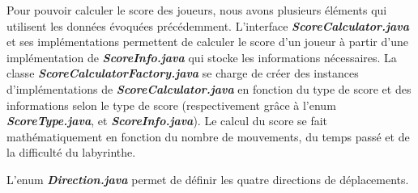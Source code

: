 Pour pouvoir calculer le score des joueurs, nous avons plusieurs éléments qui
utilisent les données évoquées précédemment. L'interface \textbf{\textit{ScoreCalculator.java}}
et ses implémentations permettent de calculer le score d'un joueur à partir
d'une implémentation de \textbf{\textit{ScoreInfo.java}} qui stocke les informations
nécessaires. La classe \textbf{\textit{ScoreCalculatorFactory.java}} se charge de créer des
instances d'implémentations de \textbf{\textit{ScoreCalculator.java}} en fonction du type de
score et des informations selon le type de score (respectivement grâce à l'enum
\textbf{\textit{ScoreType.java}}, et \textbf{\textit{ScoreInfo.java}}). Le calcul du score se fait
mathématiquement en fonction du nombre de mouvements, du temps passé et de la
difficulté du labyrinthe.

L'enum \textbf{\textit{Direction.java}} permet de définir les quatre directions de déplacements.
